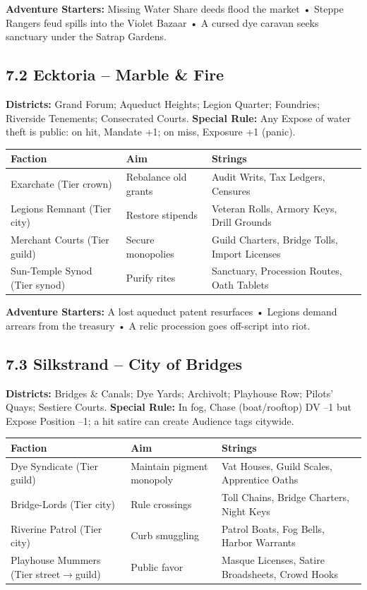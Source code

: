 \documentclass[11pt]{article}
\begin{document}
\textbf{Adventure Starters:} Missing Water Share deeds flood the market • Steppe Rangers feud spills into the Violet Bazaar • A cursed dye caravan seeks sanctuary under the Satrap Gardens.

\subsection*{7.2 Ecktoria -- Marble \& Fire}
\textbf{Districts:} Grand Forum; Aqueduct Heights; Legion Quarter; Foundries; Riverside Tenements; Consecrated Courts.  
\textbf{Special Rule:} Any Expose of water theft is public: on hit, Mandate +1; on miss, Exposure +1 (panic).

\begin{tabular}{@{}p{3cm}p{3.5cm}p{3.5cm}@{}}
\toprule
Faction & Aim & Strings \\
\midrule
Exarchate (Tier crown) & Rebalance old grants & Audit Writs, Tax Ledgers, Censures \\
Legions Remnant (Tier city) & Restore stipends & Veteran Rolls, Armory Keys, Drill Grounds \\
Merchant Courts (Tier guild) & Secure monopolies & Guild Charters, Bridge Tolls, Import Licenses \\
Sun-Temple Synod (Tier synod) & Purify rites & Sanctuary, Procession Routes, Oath Tablets \\
\bottomrule
\end{tabular}

\textbf{Adventure Starters:} A lost aqueduct patent resurfaces • Legions demand arrears from the treasury • A relic procession goes off-script into riot.

\subsection*{7.3 Silkstrand -- City of Bridges}
\textbf{Districts:} Bridges \& Canals; Dye Yards; Archivolt; Playhouse Row; Pilots' Quays; Sestiere Courts.  
\textbf{Special Rule:} In fog, Chase (boat/rooftop) DV --1 but Expose Position --1; a hit satire can create Audience tags citywide.

\begin{tabular}{@{}p{3cm}p{3.5cm}p{3.5cm}@{}}
\toprule
Faction & Aim & Strings \\
\midrule
Dye Syndicate (Tier guild) & Maintain pigment monopoly & Vat Houses, Guild Scales, Apprentice Oaths \\
Bridge-Lords (Tier city) & Rule crossings & Toll Chains, Bridge Charters, Night Keys \\
Riverine Patrol (Tier city) & Curb smuggling & Patrol Boats, Fog Bells, Harbor Warrants \\
Playhouse Mummers (Tier street$\rightarrow$guild) & Public favor & Masque Licenses, Satire Broadsheets, Crowd Hooks \\
\bottomrule
\end{tabular}
\end{document}

